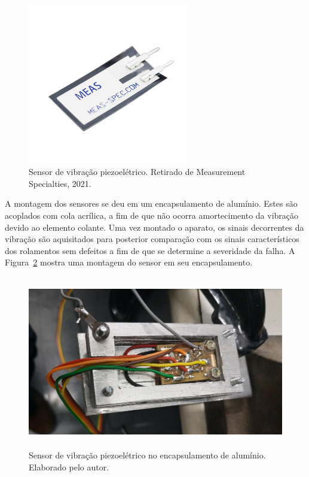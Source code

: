 \documentclass[
	12pt,				
	oneside,			
	a4paper,			
	english,			
	brazil,			
	]{abntex2ppgsi}
\begin{document}
\begin{figure}[H]
\centering
\includegraphics[width=\textwidth,height=70mm,keepaspectratio]{Figura21}
\caption {Sensor de vibração piezoelétrico. Retirado de Measurement Specialties, 2021.}
\label{Figura21}
\end{figure} 

A montagem dos sensores se deu em um encapsulamento de alumínio. Estes são acoplados com cola acrílica, a fim de que não ocorra amortecimento da vibração devido ao elemento colante. Uma vez montado o aparato, os sinais decorrentes da vibração são aquisitados para posterior comparação com os sinais característicos dos rolamentos sem defeitos a fim de que se determine a severidade da falha. A Figura~\ref{encapsulamento_sensor} mostra uma montagem do sensor em seu encapsulamento.

\begin{figure}[H]
\centering
\includegraphics[width=\textwidth,height=75mm,keepaspectratio]{encapsulamento_sensor}
\caption {Sensor de vibração piezoelétrico no encapsulamento de alumínio. Elaborado pelo autor.}
\label{encapsulamento_sensor}
\end{figure} 
\end{document}
